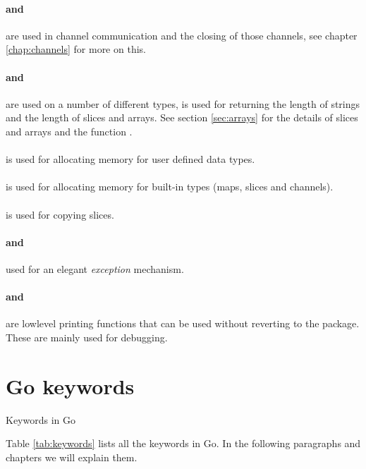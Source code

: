 \paragraph{ and } are used in
channel communication and the closing of those channels, see chapter \ref{chap:channels}
for more on this.

\paragraph{ and } are used on a number of different
types,  is
used for returning the length of strings and the length of slices and
arrays. See section \ref{sec:arrays} for the details of slices and
arrays and the function .

\paragraph{} is used for allocating memory for user defined
data types.

\paragraph{} is used for allocating memory for built-in
types (maps, slices and channels).

\paragraph{} is used for copying slices. 

\paragraph{ and } used for an elegant \emph{exception} mechanism.

\paragraph{ and } are lowlevel printing
functions that can be used without reverting to the 
package. These are mainly used for debugging.

\section{Go keywords}
\begin{table}[H]
\begin{center}
\caption{Keywords in Go}
\label{tab:keywords}

\end{center}
\end{table}
Table \ref{tab:keywords} lists all the keywords in Go. 
In the following paragraphs and chapters we will explain them.

